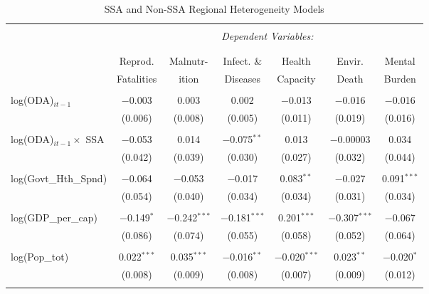 \renewcommand{\arraystretch}{0.85} %

\begin{table}[!htbp] \centering 
  \caption{SSA and Non-SSA Regional Heterogeneity Models} 
  \label{tab:regionalvariation} 
\begin{tabular}{@{\extracolsep{-3pt}}lcccccc} 
\\[-1.8ex]\hline 
\hline \\[-1.8ex] 
& \multicolumn{6}{c}{\textit{Dependent Variables:}} \\ 
\cline{2-7} 
\\[-1.8ex] & \multicolumn{6}{c}{ } \\ 
 & Reprod. & Malnutr-  & Infect. \& & Health & Envir. & Mental\\
 & Fatalities & ition & Diseases & Capacity & Death & Burden \\
 \hline \\[-1.8ex] 
log(ODA)$_{it-1}$ & $-$0.003 & 0.003 & 0.002 & $-$0.013 & $-$0.016 & $-$0.016 \\ 
  & (0.006) & (0.008) & (0.005) & (0.011) & (0.019) & (0.016) \\ 
  & & & & & & \\ 
 log(ODA)$_{it-1}\times $ SSA & $-$0.053 & 0.014 & $-$0.075$^{**}$ & 0.013 & $-$0.00003 & 0.034 \\ 
  & (0.042) & (0.039) & (0.030) & (0.027) & (0.032) & (0.044) \\ 
  & & & & & & \\  
  log(Govt\_Hth\_Spnd) & $-$0.064 & $-$0.053 & $-$0.017 & 0.083$^{**}$ & $-$0.027 & 0.091$^{***}$ \\ 
  & (0.054) & (0.040) & (0.034) & (0.034) & (0.031) & (0.034) \\ 
  & & & & & & \\ 
 log(GDP\_per\_cap) & $-$0.149$^{*}$ & $-$0.242$^{***}$ & $-$0.181$^{***}$ & 0.201$^{***}$ & $-$0.307$^{***}$ & $-$0.067 \\ 
  & (0.086) & (0.074) & (0.055) & (0.058) & (0.052) & (0.064) \\ 
  & & & & & & \\ 
 log(Pop\_tot) & 0.022$^{***}$ & 0.035$^{***}$ & $-$0.016$^{**}$ & $-$0.020$^{***}$ & 0.023$^{**}$ & $-$0.020$^{*}$ \\ 
  & (0.008) & (0.009) & (0.008) & (0.007) & (0.009) & (0.012) \\ 
  & & & & & & \\ 

\end{tabular}
\end{table}
